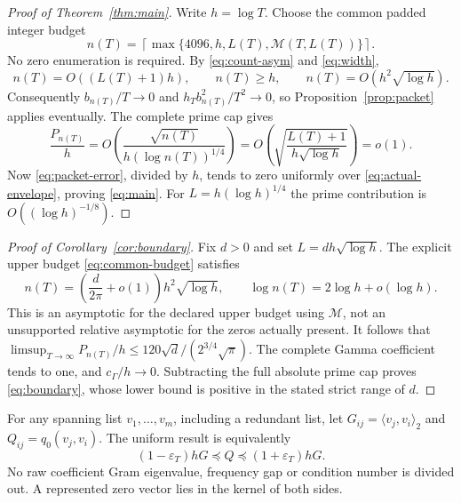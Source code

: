 \documentclass[11pt]{article}
\theoremstyle{remark}
\newcommand{\ip}[2]{\langle #1,#2\rangle}
\newcommand{\cg}{c_\Gamma}
\begin{document}
\begin{proof}[Proof of Theorem~\ref{thm:main}]
Write $h=\log T$. Choose the common padded integer budget
\begin{equation}\label{eq:common-budget}
 n(T)=\left\lceil\max\{4096,h,L(T),\mathcal M(T,L(T))\}\right\rceil.
\end{equation}
No zero enumeration is required.
By \eqref{eq:count-asym} and \eqref{eq:width},
\[
 n(T)=O((L(T)+1)h),\qquad n(T)\ge h,\qquad
 n(T)=O(h^2\sqrt{\log h}).
\]
Consequently $b_{n(T)}/T\to0$ and $h_Tb_{n(T)}^2/T^2\to0$,
so Proposition~\ref{prop:packet} applies eventually.
The complete prime cap gives
\begin{equation}\label{eq:relative-prime}
 \frac{P_{n(T)}}h
 =O\left(\frac{\sqrt{n(T)}}{h(\log n(T))^{1/4}}\right)
 =O\left(\sqrt{\frac{L(T)+1}{h\sqrt{\log h}}}\right)=o(1).
\end{equation}
Now \eqref{eq:packet-error}, divided by $h$, tends to zero uniformly
over \eqref{eq:actual-envelope}, proving \eqref{eq:main}.
For $L=h(\log h)^{1/4}$ the prime contribution is
$O((\log h)^{-1/8})$.
\end{proof}

\begin{proof}[Proof of Corollary~\ref{cor:boundary}]
Fix $d>0$ and set $L=dh\sqrt{\log h}$.
The explicit upper budget \eqref{eq:common-budget} satisfies
\[
 n(T)=\left(\frac d{2\pi}+o(1)\right)h^2\sqrt{\log h},
 \qquad\log n(T)=2\log h+o(\log h).
\]
This is an asymptotic for the declared upper budget using $\mathcal M$,
not an unsupported relative asymptotic for the zeros actually present.
It follows that
$\limsup_{T\to\infty}P_{n(T)}/h
 \le120\sqrt d/(2^{3/4}\sqrt\pi)$.
The complete Gamma coefficient tends to one, and $\cg/h\to0$.
Subtracting the full absolute prime cap proves \eqref{eq:boundary},
whose lower bound is positive in the stated strict range of $d$.
\end{proof}

For any spanning list $v_1,\ldots,v_m$, including a redundant list,
let $G_{ij}=\ip{v_j}{v_i}_2$ and $Q_{ij}=q_0(v_j,v_i)$.
The uniform result is equivalently
\[
 (1-\varepsilon_T)hG\preceq Q\preceq(1+\varepsilon_T)hG.
\]
No raw coefficient Gram eigenvalue, frequency gap or condition number
is divided out. A represented zero vector lies in the kernel of both sides.
\end{document}
